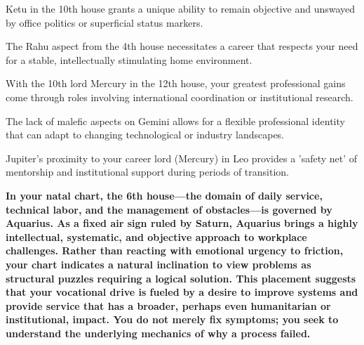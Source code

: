 \begin{diamondlist}
  \item {\fontsize{8.5}{12}\selectfont Ketu in the 10th house grants a unique ability to remain objective and unswayed by office politics or superficial status markers.}
  \item {\fontsize{8.5}{12}\selectfont The Rahu aspect from the 4th house necessitates a career that respects your need for a stable, intellectually stimulating home environment.}
  \item {\fontsize{8.5}{12}\selectfont With the 10th lord Mercury in the 12th house, your greatest professional gains come through roles involving international coordination or institutional research.}
  \item {\fontsize{8.5}{12}\selectfont The lack of malefic aspects on Gemini allows for a flexible professional identity that can adapt to changing technological or industry landscapes.}
  \item {\fontsize{8.5}{12}\selectfont Jupiter's proximity to your career lord (Mercury) in Leo provides a 'safety net' of mentorship and institutional support during periods of transition.}
\end{diamondlist}


\label{topic14}

{\fontsize{9.5}{13.8}\selectfont\bfseries\color{DeepSlate} In your natal chart, the 6th house---the domain of daily service, technical labor, and the management of obstacles---is governed by Aquarius. As a fixed air sign ruled by Saturn, Aquarius brings a highly intellectual, systematic, and objective approach to workplace challenges. Rather than reacting with emotional urgency to friction, your chart indicates a natural inclination to view problems as structural puzzles requiring a logical solution. This placement suggests that your vocational drive is fueled by a desire to improve systems and provide service that has a broader, perhaps even humanitarian or institutional, impact. You do not merely fix symptoms; you seek to understand the underlying mechanics of why a process failed.}\par\vspace{2mm}

